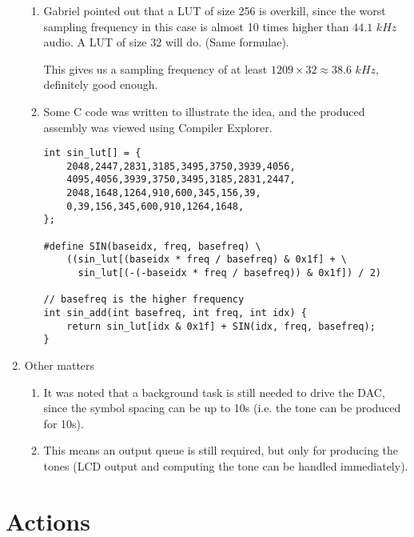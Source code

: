\documentclass[11pt,a4paper]{scrartcl}
\begin{document}
\begin{enumerate}
\begin{enumerate}
        \item Gabriel pointed out that a LUT of size 256 is overkill, since the worst sampling frequency in this case is 
            almost 10 times higher than $44.1\,\,kHz$ audio. A LUT of size 32 will do. (Same formulae).

            This gives us a sampling frequency of at least $1209 \times 32 \approx 38.6\,\,kHz$, definitely good enough.

        \item Some C code was written to illustrate the idea, and the produced assembly was viewed using Compiler Explorer.

            \begin{verbatim}
int sin_lut[] = {
    2048,2447,2831,3185,3495,3750,3939,4056,
    4095,4056,3939,3750,3495,3185,2831,2447,
    2048,1648,1264,910,600,345,156,39,
    0,39,156,345,600,910,1264,1648,
};

#define SIN(baseidx, freq, basefreq) \
    ((sin_lut[(baseidx * freq / basefreq) & 0x1f] + \
      sin_lut[(-(-baseidx * freq / basefreq)) & 0x1f]) / 2)

// basefreq is the higher frequency
int sin_add(int basefreq, int freq, int idx) {
    return sin_lut[idx & 0x1f] + SIN(idx, freq, basefreq);
}
            \end{verbatim}
    \end{enumerate}

\item Other matters
   \begin{enumerate}
   \item It was noted that a background task is still needed to drive the DAC, since the symbol spacing can be up to 10s (i.e. the tone can be produced for 10s).
   \item This means an output queue is still required, but only for producing the tones (LCD output and computing the tone can be handled immediately).
   \end{enumerate}

\end{enumerate}

\section*{Actions}
\end{document}
